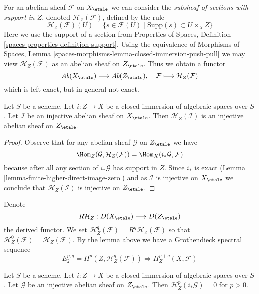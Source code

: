 \medskip\noindent
For an abelian sheaf $\mathcal{F}$ on $X_\etale$ we can consider
the {\it subsheaf of sections with support in $Z$}, denoted
$\mathcal{H}_Z(\mathcal{F})$, defined by the rule
$$
\mathcal{H}_Z(\mathcal{F})(U) =
\{s \in \mathcal{F}(U) \mid \text{Supp}(s) \subset U \times_X Z\}
$$
Here we use the support of a section from
Properties of Spaces, Definition \ref{spaces-properties-definition-support}.
Using the equivalence of Morphisms of Spaces, Lemma
\ref{spaces-morphisms-lemma-closed-immersion-push-pull}
we may view $\mathcal{H}_Z(\mathcal{F})$ as an abelian sheaf on
$Z_\etale$. Thus we obtain a functor
$$
\textit{Ab}(X_\etale) \longrightarrow \textit{Ab}(Z_\etale),\quad
\mathcal{F} \longmapsto \mathcal{H}_Z(\mathcal{F})
$$
which is left exact, but in general not exact.

\begin{lemma}
\label{lemma-sections-with-support-acyclic}
Let $S$ be a scheme.
Let $i : Z \to X$ be a closed immersion of algebraic spaces over $S$.
Let $\mathcal{I}$ be an injective abelian sheaf on $X_\etale$.
Then $\mathcal{H}_Z(\mathcal{I})$ is an injective abelian sheaf
on $Z_\etale$.
\end{lemma}

\begin{proof}
Observe that for any abelian sheaf $\mathcal{G}$ on $Z_\etale$
we have
$$
\Hom_Z(\mathcal{G}, \mathcal{H}_Z(\mathcal{F})) =
\Hom_X(i_*\mathcal{G}, \mathcal{F})
$$
because after all any section of $i_*\mathcal{G}$ has support in $Z$.
Since $i_*$ is exact (Lemma \ref{lemma-finite-higher-direct-image-zero})
and as $\mathcal{I}$ is injective on $X_\etale$ we conclude that
$\mathcal{H}_Z(\mathcal{I})$ is injective on $Z_\etale$.
\end{proof}

\noindent
Denote
$$
R\mathcal{H}_Z : D(X_\etale) \longrightarrow D(Z_\etale)
$$
the derived functor. We set
$\mathcal{H}^q_Z(\mathcal{F}) = R^q\mathcal{H}_Z(\mathcal{F})$ so that
$\mathcal{H}^0_Z(\mathcal{F}) = \mathcal{H}_Z(\mathcal{F})$.
By the lemma above we have a Grothendieck spectral sequence
$$
E_2^{p, q} = H^p(Z, \mathcal{H}^q_Z(\mathcal{F}))
\Rightarrow H^{p + q}_Z(X, \mathcal{F})
$$

\begin{lemma}
\label{lemma-cohomology-with-support-sheaf-on-support}
Let $S$ be a scheme. Let $i : Z \to X$ be a closed immersion of
algebraic spaces over $S$. Let $\mathcal{G}$ be an injective abelian
sheaf on $Z_\etale$. Then $\mathcal{H}^p_Z(i_*\mathcal{G}) = 0$ for $p > 0$.
\end{lemma}


